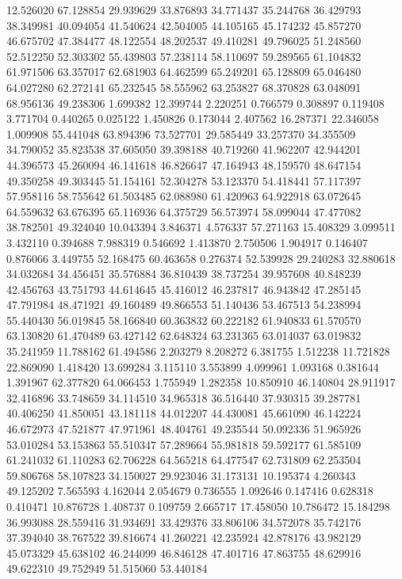 12.526020
67.128854
29.939629
33.876893
34.771437
35.244768
36.429793
38.349981
40.094054
41.540624
42.504005
44.105165
45.174232
45.857270
46.675702
47.384477
48.122554
48.202537
49.410281
49.796025
51.248560
52.512250
52.303302
55.439803
57.238114
58.110697
59.289565
61.104832
61.971506
63.357017
62.681903
64.462599
65.249201
65.128809
65.046480
64.027280
62.272141
65.232545
58.555962
63.253827
68.370828
63.048091
68.956136
49.238306
1.699382
12.399744
2.220251
0.766579
0.308897
0.119408
3.771704
0.440265
0.025122
1.450826
0.173044
2.407562
16.287371
22.346058
1.009908
55.441048
63.894396
73.527701
29.585449
33.257370
34.355509
34.790052
35.823538
37.605050
39.398188
40.719260
41.962207
42.944201
44.396573
45.260094
46.141618
46.826647
47.164943
48.159570
48.647154
49.350258
49.303445
51.154161
52.304278
53.123370
54.418441
57.117397
57.958116
58.755642
61.503485
62.088980
61.420963
64.922918
63.072645
64.559632
63.676395
65.116936
64.375729
56.573974
58.099044
47.477082
38.782501
49.324040
10.043394
3.846371
4.576337
57.271163
15.408329
3.099511
3.432110
0.394688
7.988319
0.546692
1.413870
2.750506
1.904917
0.146407
0.876066
3.449755
52.168475
60.463658
0.276374
52.539928
29.240283
32.880618
34.032684
34.456451
35.576884
36.810439
38.737254
39.957608
40.848239
42.456763
43.751793
44.614645
45.416012
46.237817
46.943842
47.285145
47.791984
48.471921
49.160489
49.866553
51.140436
53.467513
54.238994
55.440430
56.019845
58.166840
60.363832
60.222182
61.940833
61.570570
63.130820
61.470489
63.427142
62.648324
63.231365
63.014037
63.019832
35.241959
11.788162
61.494586
2.203279
8.208272
6.381755
1.512238
11.721828
22.869090
1.418420
13.699284
3.115110
3.553899
4.099961
1.093168
0.381644
1.391967
62.377820
64.066453
1.755949
1.282358
10.850910
46.140804
28.911917
32.416896
33.748659
34.114510
34.965318
36.516440
37.930315
39.287781
40.406250
41.850051
43.181118
44.012207
44.430081
45.661090
46.142224
46.672973
47.521877
47.971961
48.404761
49.235544
50.092336
51.965926
53.010284
53.153863
55.510347
57.289664
55.981818
59.592177
61.585109
61.241032
61.110283
62.706228
64.565218
64.477547
62.731809
62.253504
59.806768
58.107823
34.150027
29.923046
31.173131
10.195374
4.260343
49.125202
7.565593
4.162044
2.054679
0.736555
1.092646
0.147416
0.628318
0.410471
10.876728
1.408737
0.109759
2.665717
17.458050
10.786472
15.184298
36.993088
28.559416
31.934691
33.429376
33.806106
34.572078
35.742176
37.394040
38.767522
39.816674
41.260221
42.235924
42.878176
43.982129
45.073329
45.638102
46.244099
46.846128
47.401716
47.863755
48.629916
49.622310
49.752949
51.515060
53.440184
